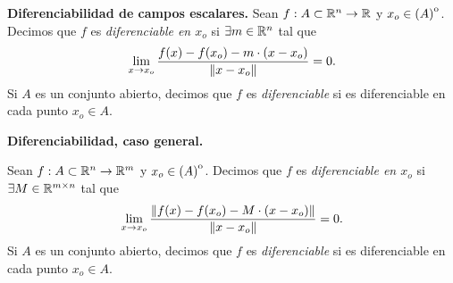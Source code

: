 \label{sec:diferenciabilidad}

\begin{definition}\textbf{Diferenciabilidad de campos escalares.} \label{def:dif_escalar}
\mbox{}
Sean $f: A \subset \mathbb{R}^n \to \mathbb{R}$ y $x_o \in {\kern0pt(A)}^{\mathrm{o}}$. Decimos que $f$ es \emph{diferenciable en $x_o$} si $\exists m \in \mathbb{R}^n$ tal que
\[
  \lim_{x \to x_o} \frac{f(x) - f(x_o) - m \cdot (x - x_o)}{\norm{x - x_o}} = 0.
\]
Si $A$ es un conjunto abierto, decimos que $f$ es \emph{diferenciable} si es diferenciable en cada punto $x_o \in A$.
\end{definition}

\begin{definition}\textbf{Diferenciabilidad, caso general.} \label{def:dif_general}
\mbox{}

Sean $f: A \subset \mathbb{R}^n \to \mathbb{R}^m$ y $x_o \in {\kern0pt(A)}^{\mathrm{o}}$. Decimos que $f$ es \emph{diferenciable en $x_o$} si $\exists M \in \mathbb{R}^{m \times n}$ tal que
\[
  \lim_{x \to x_o} \frac{\norm{f(x) - f(x_o) - M \cdot (x - x_o)}}{\norm{x - x_o}} = 0.
\]
Si $A$ es un conjunto abierto, decimos que $f$ es \emph{diferenciable} si es diferenciable en cada punto $x_o \in A$.
\end{definition}


